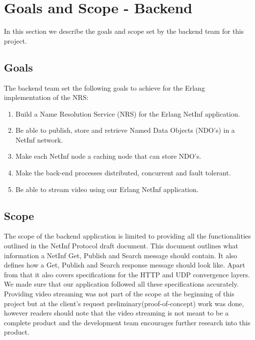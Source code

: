 \section{Goals and Scope - Backend}
In this section we describe the goals and scope set by the backend team for this project.

\subsection{Goals}
The backend team set the following goals to achieve for the Erlang implementation of the NRS:
\begin{enumerate}
 \item {Build a Name Resolution Service (NRS) for the Erlang NetInf application.}\\
 \item {Be able to publish, store and retrieve Named Data Objects (NDO's) in a NetInf network.}\\
 \item {Make each NetInf node a caching node that can store NDO's.}\\
 \item {Make the back-end processes distributed, concurrent and fault tolerant.}\\ 
 \item {Be able to stream video using our Erlang NetInf application.}\\
  \end{enumerate}

\subsection{Scope}
The scope of the backend application is limited to providing all the functionalities outlined in the NetInf Protocol draft document. \cite{netinfproto} This document outlines what information a NetInf Get, Publish and Search message should contain. It also defines how a Get, Publish and Search response message should look like. Apart from that it also covers specifications for the HTTP and UDP convergence layers. We made sure that our application followed all these specifications accurately. Providing video streaming was not part of the scope at the beginning of this project but at the client's request preliminary(proof-of-concept) work was done, however readers should note that the video streaming is not meant to be a complete product and the development team encourages further research into this product.

